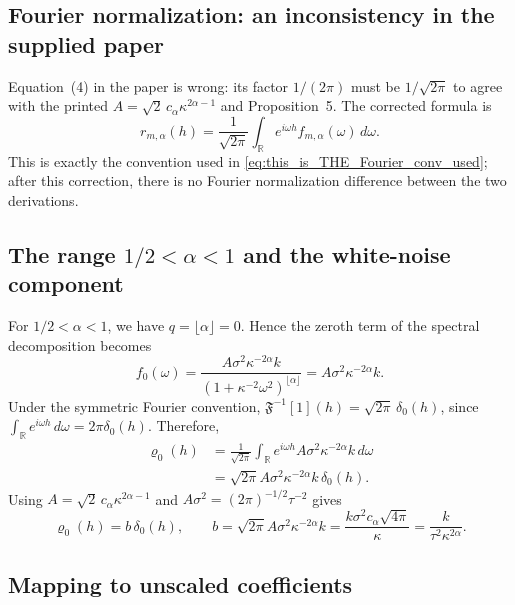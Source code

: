 \documentclass[11pt,a4paper]{article}
\theoremstyle{plain}
\theoremstyle{definition}
\begin{document}
\subsection{Fourier normalization: an inconsistency in the supplied paper}

Equation~(4) in the paper is wrong: its factor $1/(2\pi)$ must be
$1/\sqrt{2\pi}$ to agree with the printed
$A=\sqrt{2}\,c_\alpha\kappa^{2\alpha-1}$ and Proposition~5.
The corrected formula is
\begin{equation}
r_{m,\alpha}(h)=\frac{1}{\sqrt{2\pi}}
\int_{\mathbb R}e^{i\omega h}f_{m,\alpha}(\omega)\,d\omega.
\end{equation}
This is exactly the convention used in
\eqref{eq:this_is_THE_Fourier_conv_used}; after this correction, there
is no Fourier normalization difference between the two derivations.

\subsection{The range \texorpdfstring{$1/2<\alpha<1$}{1/2 < alpha < 1} and the white-noise component}
\label{sec:white_noise_component}

For $1/2<\alpha<1$, we have $q=\lfloor\alpha\rfloor=0$. Hence the
zeroth term of the spectral decomposition becomes
\begin{equation}
f_0(\omega)
=\frac{A\sigma^2\kappa^{-2\alpha}k}
 {(1+\kappa^{-2}\omega^2)^{\lfloor\alpha\rfloor}}
=A\sigma^2\kappa^{-2\alpha}k.
\end{equation}
Under the symmetric Fourier convention,
$\mathfrak F^{-1}[1](h)=\sqrt{2\pi}\,\delta_0(h)$, since
$\int_{\mathbb R}e^{i\omega h}\,d\omega=2\pi\delta_0(h)$.
Therefore,
\begin{align}
\varrho_0(h)
&=\frac{1}{\sqrt{2\pi}}\int_{\mathbb R}
 e^{i\omega h}A\sigma^2\kappa^{-2\alpha}k\,d\omega\\
&=\sqrt{2\pi}A\sigma^2\kappa^{-2\alpha}k\,\delta_0(h).
\end{align}
Using $A=\sqrt{2}\,c_\alpha\kappa^{2\alpha-1}$ and
$A\sigma^2=(2\pi)^{-1/2}\tau^{-2}$ gives
\begin{equation}
\varrho_0(h)=b\,\delta_0(h),\qquad
b=\sqrt{2\pi}A\sigma^2\kappa^{-2\alpha}k
 =\frac{k\sigma^2c_\alpha\sqrt{4\pi}}{\kappa}
 =\frac{k}{\tau^2\kappa^{2\alpha}}.
\end{equation}

\subsection{Mapping to unscaled coefficients}
\end{document}
